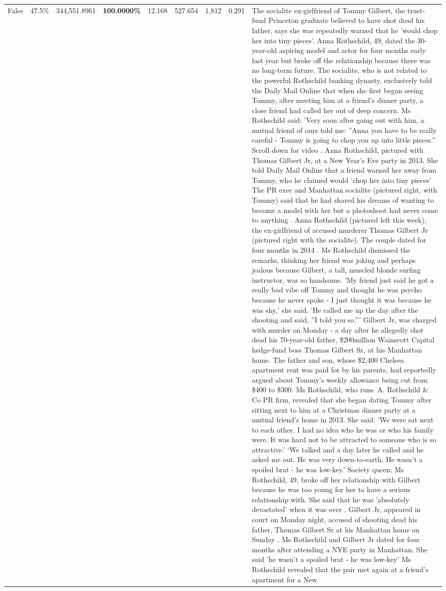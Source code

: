 \begin{table}[H]
\begin{tabular}{lllrlllll}
False & 47.5\% & 344,551.8961 & \bfseries \color{red} 100.0000\% & 12.168 & 527.654 & 1,812 & 0.291 & The socialite ex-girlfriend of Tommy Gilbert, the trust-fund Princeton graduate believed to have shot dead his father, says she was repeatedly warned that he 'would chop her into tiny pieces'. Anna Rothschild, 49, dated the 30-year-old aspiring model and actor for four months early last year but broke off the relationship because there was no long-term future. The socialite, who is not related to the powerful Rothschild banking dynasty, exclusively told the Daily Mail Online that when she first began seeing Tommy, after meeting him at a friend's dinner party, a close friend had called her out of deep concern. Ms Rothschild said: 'Very soon after going out with him, a mutual friend of ours told me: ''Anna you have to be really careful - Tommy is going to chop you up into little pieces.'' Scroll down for video . Anna Rothschild, pictured with Thomas Gilbert Jr, at a New Year's Eve party in 2013. She told Daily Mail Online that a friend warned her away from Tommy, who he claimed would 'chop her into tiny pieces' The PR exec and Manhattan socialite (pictured right, with Tommy) said that he had shared his dreams of wanting to become a model with her but a photoshoot had never come to anything . Anna Rothschild (pictured left this week), the ex-girlfriend of accused murderer Thomas Gilbert Jr (pictured right with the socialite). The couple dated for four months in 2014 . Ms Rothschild dismissed the remarks, thinking her friend was joking and perhaps jealous because Gilbert, a tall, muscled blonde surfing instructor, was so handsome. 'My friend just said he got a really bad vibe off Tommy and thought he was psycho because he never spoke - I just thought it was because he was shy,' she said. 'He called me up the day after the shooting and said, ''I told you so.''' Gilbert Jr, was charged with murder on Monday - a day after he allegedly shot dead his 70-year-old father, \$200million Wainscott Capital hedge-fund boss Thomas Gilbert Sr, at his Manhattan home. The father and son, whose \$2,400 Chelsea apartment rent was paid for by his parents, had reportedly argued about Tommy's weekly allowance being cut from \$400 to \$300. Ms Rothschild, who runs A. Rothschild \& Co PR firm, revealed that she began dating Tommy after sitting next to him at a Christmas dinner party at a mutual friend's home in 2013. She said: 'We were sat next to each other. I had no idea who he was or who his family were. It was hard not to be attracted to someone who is so attractive.' ‘We talked and a day later he called and he asked me out. He was very down-to-earth. He wasn’t a spoiled brat - he was low-key.’ Society queen: Ms Rothschild, 49, broke off her relationship with Gilbert because he was too young for her to have a serious relationship with. She said that he was 'absolutely devastated' when it was over . Gilbert Jr, appeared in court on Monday night, accused of shooting dead his father, Thomas Gilbert Sr at his Manhattan home on Sunday . Ms Rothschild and Gilbert Jr dated for four months after attending a NYE party in Manhattan. She said 'he wasn't a spoiled brat - he was low-key' Ms Rothschild revealed that the pair met again at a friend’s apartment for a New 
\end{tabular}
\end{table}
